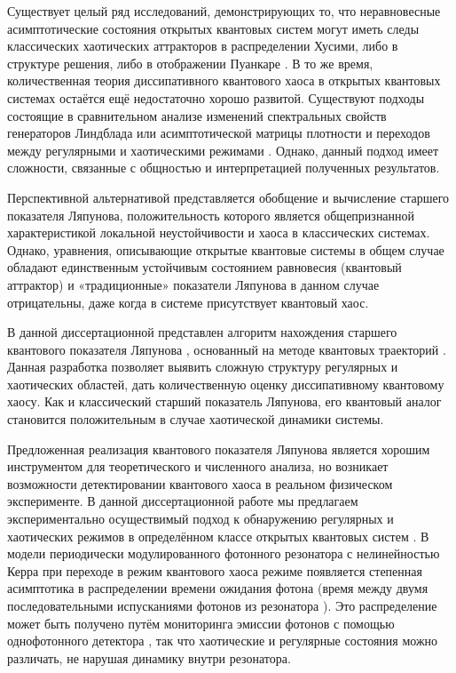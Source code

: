 Существует целый ряд исследований, демонстрирующих то, что неравновесные асимптотические состояния открытых квантовых систем могут иметь следы классических хаотических аттракторов в распределении Хусими, либо в структуре решения, либо в отображении Пуанкаре \autocite{Spiller1994, Brun1996, Hartmann2017, Ivanchenko2017, Carlo2017, Wang2018}. 
В то же время, количественная теория диссипативного квантового хаоса в открытых квантовых системах остаётся ещё недостаточно хорошо развитой. 
Существуют подходы состоящие в сравнительном анализе изменений спектральных свойств генераторов Линдблада или асимптотической матрицы плотности \autocite{Lindblad1976, book2007} и переходов между регулярными и хаотическими режимами \autocite{Hartmann2017, Ivanchenko2017, Grobe1988, Prosen2013}. 
Однако, данный подход имеет сложности, связанные с общностью и интерпретацией полученных результатов.

Перспективной альтернативой представляется обобщение и вычисление старшего показателя Ляпунова, положительность которого является общепризнанной характеристикой локальной неустойчивости и хаоса в классических системах. 
Однако, уравнения, описывающие открытые квантовые системы в общем случае обладают единственным устойчивым состоянием равновесия \autocite{book2007, Lucia2015} (квантовый аттрактор) и «традиционные» показатели Ляпунова в данном случае отрицательны, даже когда в системе присутствует квантовый хаос.

В данной диссертационной представлен алгоритм нахождения старшего квантового показателя Ляпунова \cite{Yusipov2019_2}, основанный на методе квантовых траекторий \autocite{Dum1992, Molmer1993, Plenio1998, Daley2014}.
Данная разработка позволяет выявить сложную структуру регулярных и хаотических областей, дать количественную оценку диссипативному квантовому хаосу. Как и классический старший показатель Ляпунова, его квантовый аналог становится положительным в случае хаотической динамики системы.

Предложенная реализация квантового показателя Ляпунова является хорошим инструментом для теоретического и численного анализа, но возникает возможности детектировании квантового хаоса в реальном физическом эксперименте.
В данной диссертационной работе мы предлагаем экспериментально осуществимый подход к обнаружению регулярных и хаотических режимов в определённом классе открытых квантовых систем \cite{Yusipov2020}.
В модели периодически модулированного фотонного резонатора с нелинейностью Керра \autocite{Spiller1994} при переходе в режим квантового хаоса  режиме появляется степенная асимптотика в распределении времени ожидания фотона (время между двумя последовательными испусканиями фотонов из резонатора \autocite{Vyas1989, Carmichael1989, Zhang2018}).
Это распределение может быть получено путём мониторинга эмиссии фотонов с помощью однофотонного детектора \autocite{Delteil2014, Cohen2015}, так что хаотические и регулярные состояния можно различать, не нарушая динамику внутри резонатора.

